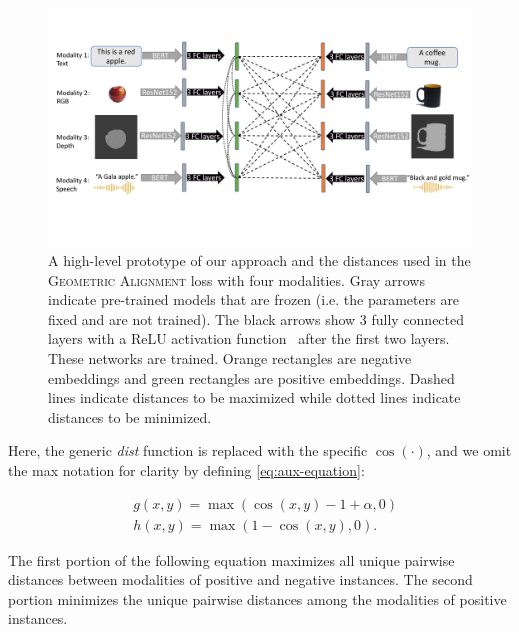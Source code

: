 \documentclass[10pt]{article} %
\newcommand{\geom}{\textsc{Geometric Alignment}}
\begin{document}
\begin{figure}[tb]
\centering
\includegraphics[width=1\columnwidth]{Figures/emma-loss-trimmed.pdf}
\caption{A high-level prototype of our approach and the distances used in the \geom{} loss with four modalities. Gray arrows indicate pre-trained models that are frozen (i.e. the parameters are fixed and are not trained). The black arrows show 3 fully connected layers with a ReLU activation function~\citep{relu2010} after the first two layers. These networks are trained.
Orange rectangles are negative embeddings and green rectangles are positive embeddings.
Dashed lines indicate distances to be maximized while dotted lines indicate distances to be minimized.%
}
\label{fig:emma-loss-trimmed}
\end{figure}


Here, the generic \textit{dist} function is replaced with the specific $\cos(\cdot)$, and we omit the max notation for clarity by defining \cref{eq:aux-equation}:

\begin{equation}\label{eq:aux-equation}
    \begin{split}
        & g(x,y) = \max(\cos(x,y)-1 + \alpha, 0 ) \\
        & h(x,y) = \max(1- \cos(x,y), 0 ).
    \end{split}
\end{equation}


The first portion of the following equation maximizes all unique pairwise distances between modalities of positive and negative instances. The second portion minimizes the unique pairwise distances among the modalities of positive instances.
\end{document}
